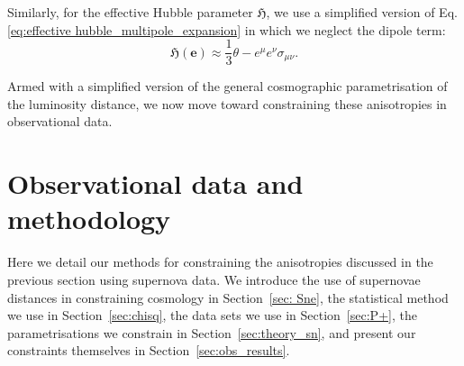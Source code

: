 \documentclass[fleqn,usenatbib]{mnras}
\begin{document}
{Similarly, for the effective Hubble parameter $\mathfrak{H}$, we use a simplified version of Eq. \eqref{eq:effective hubble_multipole_expansion} {in which we neglect} %
the dipole term:
\begin{equation}
    \label{eq: simplified effective hubble}
    \mathfrak{H}(\boldsymbol{e}) \approx \frac{1}{3}\theta - e^{\mu}e^{\nu}\sigma_{\mu\nu}.
\end{equation}




Armed with a  simplified version of the general cosmographic parametrisation {of the luminosity distance}, we now move toward constraining {these} anisotropies in %
{observational} data.



\color{black}


\section{Observational data and methodology}
Here we detail our methods for constraining the anisotropies discussed in the previous section using supernova data. We introduce %
{the use of supernovae distances in constraining cosmology} in Section~\ref{sec: Sne}, the statistical method we use in Section~\ref{sec:chisq}, the data sets we use in Section~\ref{sec:P+}, the parametrisations we constrain in Section~\ref{sec:theory_sn}, and present our constraints themselves in Section~\ref{sec:obs_results}. 


}
\end{document}
